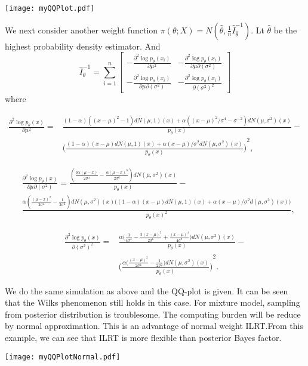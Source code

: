 \texttt{[image: myQQPlot.pdf]}


We next consider another weight function $\pi (\theta; X)= N(\hat{\theta},\frac{1}{n}\hat{I}^{-1}_{\hat{\theta}})$. Lt $\hat{\theta}$ be the highest probability density estimator. And 
$$\hat{I}_\theta^{-1}=\sum_{i=1}^n
\begin{bmatrix}
-\frac{\partial^2 \log p_\theta(x_i)}{\partial \mu^2}&
    -\frac{\partial^2 \log p_\theta(x_i)}{\partial \mu\partial (\sigma^2)}
\\
    -\frac{\partial^2 \log p_\theta(x_i)}{\partial \mu\partial (\sigma^2)}
    &
    -\frac{\partial^2 \log p_\theta(x_i)}{\partial {(\sigma^2)}^2}
\end{bmatrix}$$
where

\begin{equation}
    \begin{aligned}
\frac{\partial^2 \log p_\theta(x)}{\partial
        \mu^2}=&
        \frac{(1-\alpha)({(x-\mu)}^2-1)dN(\mu,1)(x)+\alpha ({(x-\mu)}^2/\sigma^4 -\sigma^{-2})dN(\mu,\sigma^2)(x)}{p_\theta (x)}-\\
        &
        {\Big(\frac{(1-\alpha)(x-\mu)dN(\mu,1)(x)+\alpha(x-\mu)/\sigma^2 dN(\mu,\sigma^2)(x)}{p_\theta(x)}\Big)}^2,
    \end{aligned}
\end{equation}

\begin{equation}
    \begin{aligned}
        &\frac{\partial^2 \log p_\theta(x)}{\partial
        \mu\partial(\sigma^2)}=
        \frac{(\frac{3\alpha(\mu-x)}{2\sigma^4}-\frac{\alpha {(\mu-x)}^3}{2\sigma^6})dN(\mu,\sigma^2)(x)}{p_\theta (x)}-\\
        &
        \frac{\alpha (\frac{{(\mu-x)}^2}{2\sigma^4}-\frac{1}{2\sigma^2})dN(\mu,\sigma^2)(x)\big((1-\alpha)(x-\mu)dN(\mu,1)(x)+\alpha(x-\mu)/\sigma^2 d(\mu,\sigma^2)(x)\big)}{p_{\theta}{(x)}^2},
    \end{aligned}
\end{equation}


\begin{equation}
    \begin{aligned}
\frac{\partial^2 \log p_\theta(x)}{\partial
        {(\sigma^2)}^2}=&
        \frac{\alpha \big(\frac{3}{4\sigma^4}-\frac{3{(x-\mu)}^2}{2\sigma^6} +\frac{{(x-\mu)}^4}{4\sigma^8}\big)dN(\mu,\sigma^2)(x)}{p_\theta (x)}-\\
        &
        {\Big(\frac{\alpha\big(\frac{{(x-\mu)}^2}{2\sigma^4}-\frac{1}{2\sigma^2} \big)dN(\mu,\sigma^2)(x)}{p_\theta(x)}\Big)}^2.
    \end{aligned}
\end{equation}

We do the same simulation as above and the QQ-plot is given.
It  can be seen that the Wilks phenomenon still holds in this case.
For mixture model, sampling from posterior distribution is troublesome.
The computing burden will be reduce by normal approximation.
This is an advantage of normal weight ILRT.\@ From this example, we can see that ILRT is more flexible than posterior Bayes factor.


\texttt{[image: myQQPlotNormal.pdf]}
